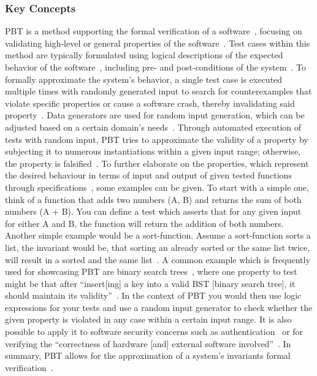 \documentclass[runningheads]{llncs}
\begin{document}
\subsubsection{Key Concepts}
PBT is a method supporting the formal verification of a software~\cite{Chen2022,Fink1997,Honarvar2020,Paraskevopoulou2015}, focusing on validating high-level or general properties of the software~\cite{Fink1997,Honarvar2020,Corgozinho2023}. Test cases within this method are typically formulated using logical descriptions of the expected behavior of the software~\cite{Chen2022,Fink1997,Honarvar2020,Loescher2017,Corgozinho2023}, including pre- and post-conditions of the system~\cite{Honarvar2020}. To formally approximate the system's behavior, a single test case is executed multiple times with randomly generated input to search for counterexamples that violate specific properties or cause a software crash, thereby invalidating said property~\cite{Chen2022,Loescher2017,Padhye2019,ElazarMittelman2023,Paraskevopoulou2015,Corgozinho2023}. Data generators are used for random input generation, which can be adjusted based on a certain domain's needs~\cite{Chen2022,Loescher2017,Padhye2019,ElazarMittelman2023}. Through automated execution of tests with random input, PBT tries to approximate the validity of a property by subjecting it to numerous instantiations within a given input range; otherwise, the property is falsified~\cite{Fink1997,ElazarMittelman2023,Corgozinho2023,Paraskevopoulou2015}. To further elaborate on the properties, which represent the desired behaviour in terms of input and output of given tested functions through specifications~\cite{Chen2022,Fink1997,Loescher2017}, some examples can be given. To start with a simple one, think of a function that adds two numbers (A, B) and returns the sum of both numbers (A + B). You can define a test which asserts that for any given input for either A and B, the function will return the addition of both numbers. Another simple example would be a sort-function. Assume a sort-function sorts a list, the invariant would be, that sorting an already sorted or the same list twice, will result in a sorted and the same list~\cite{Corgozinho2023}. A common example which is frequently used for showcasing PBT are binary search trees~\cite{Corgozinho2023,Shi2023}, where one property to test might be that after ``insert[ing] a key into a valid BST [binary search tree], it should maintain its validity''~\cite{Shi2023}. In the context of PBT you would then use logic expressions for your tests and use a random input generator to check whether the given property is violated in any case within a certain input range. It is also possible to apply it to software security concerns such as authentication~\cite{Fink1997} or for verifying the ``correctness of hardware [and] external software involved''~\cite{Chen2022}. In summary, PBT allows for the approximation of a system's invariants formal verification~\cite{Fink1997,ElazarMittelman2023,Corgozinho2023}.
\end{document}
